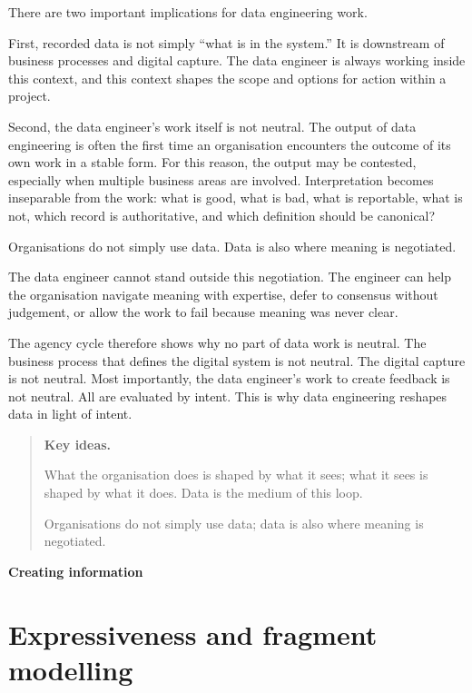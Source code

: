 \documentclass[10pt,openany,10pt]{book}
\begin{document}
There are two important implications for data engineering work.

First, recorded data is not simply ``what is in the system.'' It is
downstream of business processes and digital capture. The data engineer
is always working inside this context, and this context shapes the scope
and options for action within a project.

Second, the data engineer's work itself is not neutral. The output of
data engineering is often the first time an organisation encounters the
outcome of its own work in a stable form. For this reason, the output
may be contested, especially when multiple business areas are involved.
Interpretation becomes inseparable from the work: what is good, what is
bad, what is reportable, what is not, which record is authoritative, and
which definition should be canonical?

Organisations do not simply use data. Data is also where meaning is
negotiated.

The data engineer cannot stand outside this negotiation. The engineer
can help the organisation navigate meaning with expertise, defer to
consensus without judgement, or allow the work to fail because meaning
was never clear.

The agency cycle therefore shows why no part of data work is neutral.
The business process that defines the digital system is not neutral. The
digital capture is not neutral. Most importantly, the data engineer's
work to create feedback is not neutral. All are evaluated by intent.
This is why data engineering reshapes data in light of intent.

\begin{quote}
\textbf{Key ideas.}

What the organisation does is shaped by what it sees; what it sees is
shaped by what it does. Data is the medium of this loop.

Organisations do not simply use data; data is also where meaning is
negotiated.
\end{quote}

\newpage

\thispagestyle{empty}
\hypertarget{docs-creating-information}{}
\vspace*{0.34\textheight}
\begin{center}
{\Huge\bfseries Creating information}
\end{center}
\newpage

\chapter{Expressiveness and fragment
modelling}\label{docs-creating-information-expressiveness-and-fragment-modelling}
\end{document}
